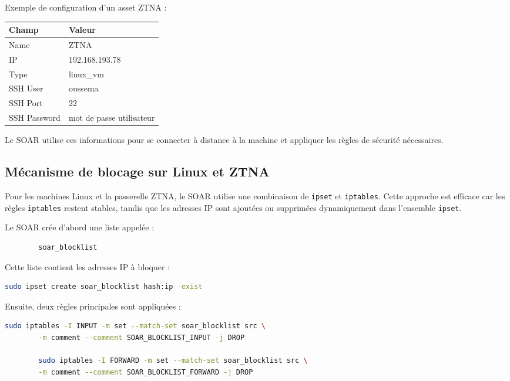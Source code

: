 \documentclass[12pt,a4paper,oneside]{report}
\begin{document}
    Exemple de configuration d'un asset ZTNA :
    
    \begin{center}
    	\begin{tabular}{|l|l|}
    		\hline
    		Champ & Valeur \\
    		\hline
    		Name & ZTNA \\
    		IP & 192.168.193.78 \\
    		Type & linux\_vm \\
    		SSH User & oussema \\
    		SSH Port & 22 \\
    		SSH Password & mot de passe utilisateur \\
    		\hline
    	\end{tabular}
    \end{center}
    
    Le SOAR utilise ces informations pour se connecter à distance à la machine et appliquer les règles de sécurité nécessaires.
    
    \subsection{Mécanisme de blocage sur Linux et ZTNA}
    
    Pour les machines Linux et la passerelle ZTNA, le SOAR utilise une combinaison de \texttt{ipset} et \texttt{iptables}. Cette approche est efficace car les règles \texttt{iptables} restent stables, tandis que les adresses IP sont ajoutées ou supprimées dynamiquement dans l'ensemble \texttt{ipset}.
    
    Le SOAR crée d'abord une liste appelée :
    
    \begin{lstlisting}
    	soar_blocklist
    \end{lstlisting}
    
    Cette liste contient les adresses IP à bloquer :
    
    \begin{lstlisting}[language=bash]
    	sudo ipset create soar_blocklist hash:ip -exist
    \end{lstlisting}
    
    Ensuite, deux règles principales sont appliquées :
    
    \begin{lstlisting}[language=bash]
    	sudo iptables -I INPUT -m set --match-set soar_blocklist src \
    	-m comment --comment SOAR_BLOCKLIST_INPUT -j DROP
    	
    	sudo iptables -I FORWARD -m set --match-set soar_blocklist src \
    	-m comment --comment SOAR_BLOCKLIST_FORWARD -j DROP
    \end{lstlisting}
    
\end{document}
